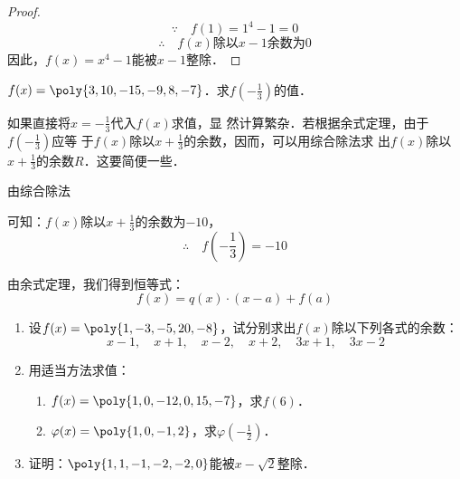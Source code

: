 \begin{proof}
\[\because\quad f(1)=1^4-1=0\]
\[\therefore\quad f(x)\text{除以}x-1\text{余数为0}\]
因此，$f(x)=x^4-1$能被$x-1$整除．
\end{proof}

\begin{example}
$f(x)=\poly{3,10,-15,-9,8,-7}$．求$f\left(-\frac{1}{3}\right)$的值．
\end{example}

\begin{note}
如果直接将$x=-\frac{1}{3}$代入$f(x)$求值，显
    然计算繁杂．若根据余式定理，由于$f\left(-\frac{1}{3}\right)$应等
    于$f(x)$除以$x+\frac{1}{3}$的余数，因而，可以用综合除法求
    出$f(x)$除以$x+\frac{1}{3}$的余数$R$．这要简便一些．
\end{note}

\begin{solution}
由综合除法
\begin{center}
    \end{center}
可知：$f(x)$除以$x+\frac{1}{3}$的余数为$-10$，
\[\therefore\quad f\left(-\frac{1}{3}\right)=-10\]
\end{solution}

由余式定理，我们得到恒等式：
\begin{equation}
    f(x)=q(x)\cdot (x-a)+f(a)
\end{equation}

\begin{ex}
\begin{enumerate}
    \item 设$f(x)=\poly{1,-3,-5,20,-8}$，试分别求出$f(x)$除以下列各式的余数：
    \[x-1,\quad x+1,\quad x-2,\quad x+2,\quad 3x+1,\quad 3x-2 \]
    \item 用适当方法求值：
    \begin{enumerate}
        \item $f(x)=\poly{1,0,-12,0,15,-7}$，求$f(6)$．
        \item $\varphi(x)=\poly{1,0,-1,2}$，求$\varphi\left(-\frac{1}{2}\right)$．
    \end{enumerate}
    \item 证明：$\poly{1,1,-1,-2,-2,0}$能被$x-\sqrt{2}$整除．
\end{enumerate}
\end{ex}

